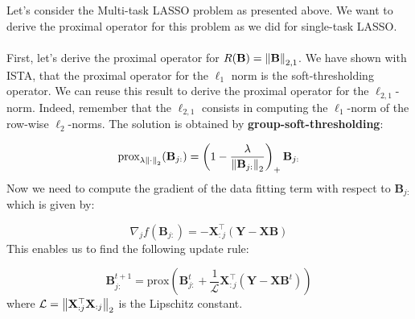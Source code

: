\documentclass[a4paper,10pt]{article}
\theoremstyle{definition}
\begin{document}
Let's consider the Multi-task LASSO problem as presented above. We want to derive the proximal operator
for this problem as we did for single-task LASSO.
\\
\\
First, let's derive the proximal operator for $R(\mathbf{B}) = \left \lVert \mathbf{B} \right \rVert_{2, 1}$. 
We have shown with ISTA, that the proximal operator for the $\ell_1$ norm is the
soft-thresholding operator. We can reuse this result to derive the proximal operator for
the $\ell_{2,1}$-norm. Indeed, remember that the $\ell_{2,1}$ consists in computing the
$\ell_1$-norm of the row-wise $\ell_2$-norms. The solution is obtained by \textbf{group-soft-thresholding}:

\begin{equation*}
    \text{prox}_{\lambda \left \lVert \cdot \right \rVert_2}
    (\mathbf{B}_{j:}) = 
    \left(
        1 - \frac{\lambda}{\left \lVert \mathbf{B}_{j:} \right \rVert_2}
    \right)_+
    \mathbf{B}_{j:}
\end{equation*}
%
Now we need to compute the gradient of the data fitting term with respect to $\mathbf{B}_{j:}$
which is given by: 

\begin{equation*}
    \nabla_j f(\mathbf{B}_{j:}) 
    = -\mathbf{X}_{:j}^{\top}
    (\mathbf{Y} - \mathbf{XB})
\end{equation*}
%
This enables us to find the following update rule:

\begin{equation*}
    \mathbf{B}_{j:}^{t+1} = 
    \text{prox}\left(
        \mathbf{B}_{j:}^{t}
        + \frac{1}{\mathcal{L}}
        \mathbf{X}_{:j}^{\top}
        (\mathbf{Y} - \mathbf{X}\mathbf{B}^t)
    \right)
\end{equation*}
%
where $\mathcal{L} = \left \lVert \mathbf{X}_{:j}^{\top}\mathbf{X}_{:j} \right \rVert_2$ is the Lipschitz constant.

\newpage


\end{document}
